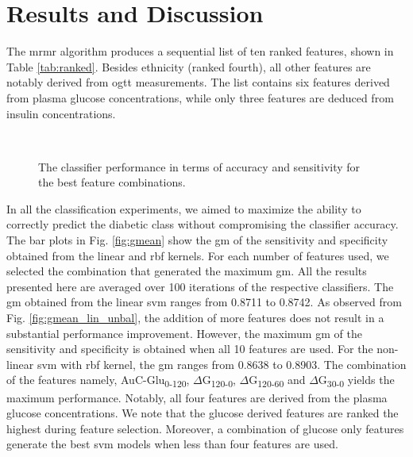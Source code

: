 \documentclass[journal,comsoc]{IEEEtran}
\renewcommand{\^}{\hat}  %
\begin{document}
%
\section{Results and Discussion}
%
%
The \ac{mrmr} algorithm produces a sequential list of ten ranked features, shown in Table \ref{tab:ranked}. Besides ethnicity (ranked fourth), all other features are notably derived from \ac{ogtt} measurements. The list contains six features derived from plasma glucose concentrations, while only three features are deduced from insulin concentrations.
%
\begin{figure}[h!]
  \centering
   \\
  \caption{The classifier performance in terms of accuracy and sensitivity for the best feature combinations.}
  \label{fig:sn_acc}
\end{figure}

In all the classification experiments, we aimed to maximize the ability to correctly predict the diabetic class without compromising the classifier accuracy. The bar plots in Fig. \ref{fig:gmean} show the \ac{gm} of the sensitivity and specificity obtained from the linear and \ac{rbf} kernels. For each number of features used, we selected the combination that generated the maximum \ac{gm}. All the results presented here are averaged over \num{100} iterations of the respective classifiers. The \ac{gm} obtained from the linear \ac{svm} ranges from \num{0.8711} to \num{0.8742}. As observed from Fig. \ref{fig:gmean_lin_unbal}, the addition of more features does not result in a substantial performance improvement. However, the maximum \ac{gm} of the sensitivity and specificity is obtained when all \num{10} features are used. For the non-linear \ac{svm} with \ac{rbf} kernel, the \ac{gm} ranges from \num{0.8638} to \num{0.8903}. The combination of the features namely, AuC-Glu\textsubscript{0-120}, $\Delta$G\textsubscript{120-0}, $\Delta$G\textsubscript{120-60} and $\Delta$G\textsubscript{30-0} yields the maximum performance. Notably, all four features are derived from the plasma glucose concentrations. We note that the glucose derived features are ranked the highest during feature selection. Moreover, a combination of glucose only features generate the best \ac{svm} models when less than four features are used.
\end{document}
